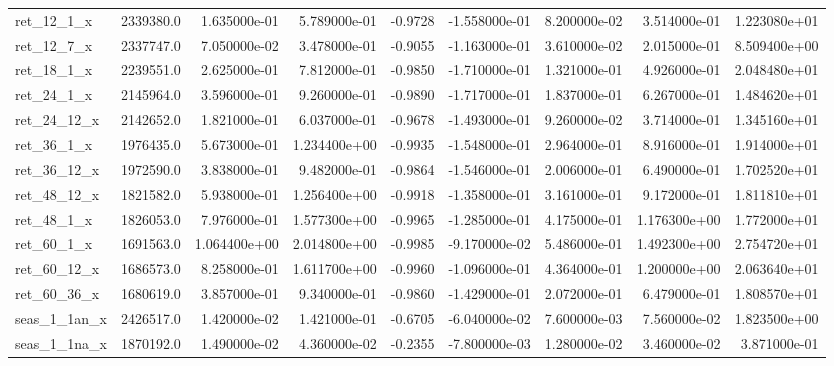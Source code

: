 \documentclass[12pt]{article}
\begin{document}
\begin{landscape}
\begin{longtable}{|l|r|r|r|r|r|r|r|r|}
ret\_12\_1\_x              &  2339380.0 &  1.635000e-01 &  5.789000e-01 &     -0.9728 & -1.558000e-01 &  8.200000e-02 &  3.514000e-01 &  1.223080e+01 \\
ret\_12\_7\_x              &  2337747.0 &  7.050000e-02 &  3.478000e-01 &     -0.9055 & -1.163000e-01 &  3.610000e-02 &  2.015000e-01 &  8.509400e+00 \\
ret\_18\_1\_x              &  2239551.0 &  2.625000e-01 &  7.812000e-01 &     -0.9850 & -1.710000e-01 &  1.321000e-01 &  4.926000e-01 &  2.048480e+01 \\
ret\_24\_1\_x              &  2145964.0 &  3.596000e-01 &  9.260000e-01 &     -0.9890 & -1.717000e-01 &  1.837000e-01 &  6.267000e-01 &  1.484620e+01 \\
ret\_24\_12\_x             &  2142652.0 &  1.821000e-01 &  6.037000e-01 &     -0.9678 & -1.493000e-01 &  9.260000e-02 &  3.714000e-01 &  1.345160e+01 \\
ret\_36\_1\_x              &  1976435.0 &  5.673000e-01 &  1.234400e+00 &     -0.9935 & -1.548000e-01 &  2.964000e-01 &  8.916000e-01 &  1.914000e+01 \\
ret\_36\_12\_x             &  1972590.0 &  3.838000e-01 &  9.482000e-01 &     -0.9864 & -1.546000e-01 &  2.006000e-01 &  6.490000e-01 &  1.702520e+01 \\
ret\_48\_12\_x             &  1821582.0 &  5.938000e-01 &  1.256400e+00 &     -0.9918 & -1.358000e-01 &  3.161000e-01 &  9.172000e-01 &  1.811810e+01 \\
ret\_48\_1\_x              &  1826053.0 &  7.976000e-01 &  1.577300e+00 &     -0.9965 & -1.285000e-01 &  4.175000e-01 &  1.176300e+00 &  1.772000e+01 \\
ret\_60\_1\_x              &  1691563.0 &  1.064400e+00 &  2.014800e+00 &     -0.9985 & -9.170000e-02 &  5.486000e-01 &  1.492300e+00 &  2.754720e+01 \\
ret\_60\_12\_x             &  1686573.0 &  8.258000e-01 &  1.611700e+00 &     -0.9960 & -1.096000e-01 &  4.364000e-01 &  1.200000e+00 &  2.063640e+01 \\
ret\_60\_36\_x             &  1680619.0 &  3.857000e-01 &  9.340000e-01 &     -0.9860 & -1.429000e-01 &  2.072000e-01 &  6.479000e-01 &  1.808570e+01 \\
seas\_1\_1an\_x            &  2426517.0 &  1.420000e-02 &  1.421000e-01 &     -0.6705 & -6.040000e-02 &  7.600000e-03 &  7.560000e-02 &  1.823500e+00 \\
seas\_1\_1na\_x            &  1870192.0 &  1.490000e-02 &  4.360000e-02 &     -0.2355 & -7.800000e-03 &  1.280000e-02 &  3.460000e-02 &  3.871000e-01 \\

\end{longtable}
\end{landscape}
\end{document}
